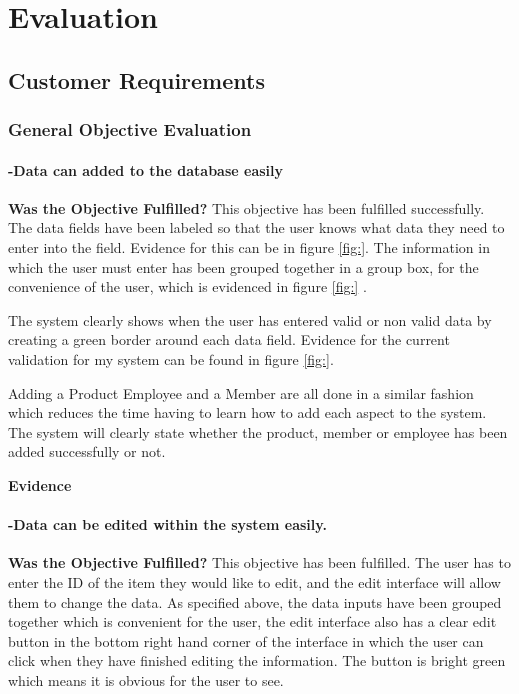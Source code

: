 \chapter{Evaluation}

\section{Customer Requirements}

\subsection{General Objective Evaluation}

\subsubsection{-Data can added to the database easily}
\textbf{Was the Objective Fulfilled?} \newline
This objective has been fulfilled successfully. The data fields have been labeled so that the user knows what data they need to enter into the field. Evidence for this can be in figure \ref{fig:}. The information in which the user must enter has been grouped together in a group box, for the convenience of the user, which is evidenced in figure \ref{fig:} .

 The system clearly shows when the user has entered valid or non valid data by creating a green border around each data field. Evidence for the current validation for my system can be found in figure \ref{fig:}. 

Adding a Product Employee and a Member are all done in a similar fashion which reduces the time having to learn how to add each aspect to the system. The system will clearly state whether the product, member or employee has been added successfully or not.\newline

\textbf{Evidence} \newline


\subsubsection{-Data can be edited within the system easily.}
\textbf{Was the Objective Fulfilled?} \newline
This objective has been fulfilled. The user has to enter the ID of the item they would like to edit, and the edit interface will allow them to change the data. As specified above, the data inputs have been grouped together which is convenient for the user, the edit interface also has a clear edit button in the bottom right hand corner of the interface in which the user can click when they have finished editing the information. The button is bright green which means it is obvious for the user to see.\newline


